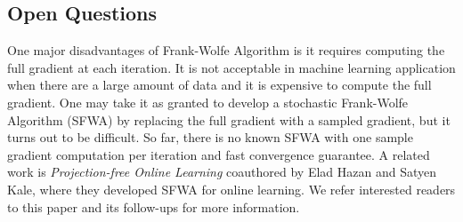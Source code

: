 \documentclass[12pt]{report}
\begin{document}
\subsection{Open Questions}
One major disadvantages of Frank-Wolfe Algorithm is it requires computing the full gradient at each iteration. It is not acceptable in machine learning application when there are a large amount of data and it is expensive to compute the full gradient. One may take it as granted to develop a stochastic Frank-Wolfe Algorithm (SFWA) by replacing the full gradient with a sampled gradient, but it turns out to be difficult. So far, there is no known SFWA with one sample gradient computation per iteration and fast convergence guarantee. A related work is \textit{Projection-free Online Learning} coauthored by Elad Hazan and Satyen Kale, where they developed SFWA for online learning. We refer interested readers to this paper and its follow-ups for more information.
\end{document}
